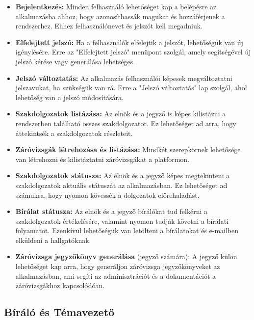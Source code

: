 \begin{itemize}

\item \textbf{Bejelentkezés:} Minden felhasználó lehetőséget kap a belépésre az alkalmazásba ahhoz, hogy azonosíthassák magukat és hozzáférjenek a rendszerhez. Ehhez felhasználónevet és jelszót kell megadniuk.

\item \textbf{Elfelejtett jelszó:} Ha a felhasználók elfelejtik a jelszót, lehetőségük van új igénylésére. Erre az "Elfelejtett jelszó" menüpont szolgál, amely segítségével új jelszó kérése vagy generálása lehetséges.

\item \textbf{Jelszó változtatás:} Az alkalmazás felhasználói képesek megváltoztatni jelszavukat, ha szükségük van rá. Erre a "Jelszó változtatás" lap szolgál, ahol lehetőség van a jelszó módosítására.

\item \textbf{Szakdolgozatok listázása:} Az elnök és a jegyző is képes kilistázni a rendszerben található összes szakdolgozatot. Ez lehetőséget ad arra, hogy áttekintsék a szakdolgozatok részleteit.

\item \textbf{Záróvizsgák létrehozása és listázása:} Mindkét szerepkörnek lehetősége van létrehozni és kilistáztatni záróvizsgákat a platformon.

\item \textbf{Szakdolgozatok státusza:} Az elnök és a jegyző képes megtekinteni a szakdolgozatok aktuális státuszát az alkalmazásban. Ez lehetőséget ad számukra, hogy nyomon kövessék a dolgozatok előrehaladást.

\item \textbf{Bírálat státusza:} Az elnök és a jegyző bírálókat tud felkérni a szakdolgozatok értékelésére, valamint nyomon tudják követni a bírálati folyamatot. Ezenkívül lehetőségük van letölteni a bírálatokat és e-mailben elküldeni a hallgatóknak.

\item \textbf{Záróvizsga jegyzőkönyv generálása} (jegyző számára): A jegyző külön lehetőséget kap arra, hogy generáljon záróvizsga jegyzőkönyveket az alkalmazásban, ami segíti az adminisztrációt és a dokumentációt a záróvizsgákhoz kapcsolódóan.
\end{itemize}



\subsection{Bíráló és Témavezető}

